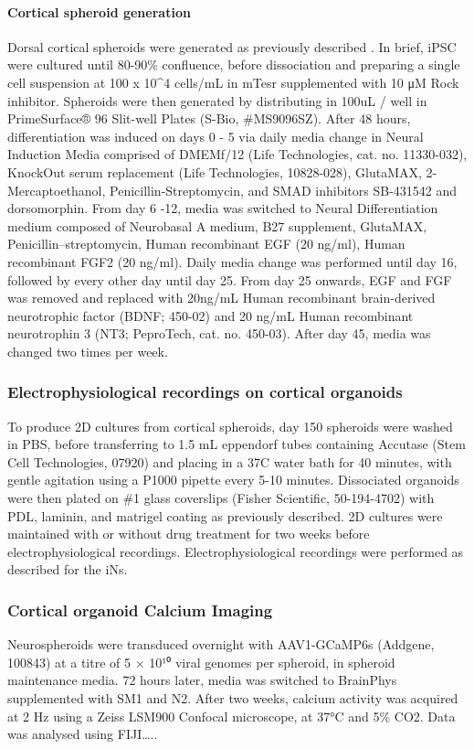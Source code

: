 \paragraph{Cortical spheroid generation}
Dorsal cortical spheroids were generated as previously described \cite{Sloan2018-ja}. In brief, iPSC were cultured until 80-90\% confluence, before dissociation and preparing a single cell suspension at 100 x 10^4 cells/mL in mTesr supplemented with 10 μM Rock inhibitor. Spheroids were then generated by distributing in 100uL / well in PrimeSurface® 96 Slit-well Plates (S-Bio, \#MS9096SZ). After 48 hours, differentiation was induced on days 0 - 5 via daily media change in Neural Induction Media comprised of DMEMf/12 (Life Technologies, cat. no. 11330-032), KnockOut serum replacement (Life Technologies, 10828-028), GlutaMAX, 2-Mercaptoethanol, Penicillin-Streptomycin, and SMAD inhibitors SB-431542 and dorsomorphin. From day 6 -12, media was switched to Neural Differentiation medium composed of Neurobasal A medium, B27 supplement, GlutaMAX, Penicillin–streptomycin, Human recombinant EGF (20 ng/ml), Human recombinant FGF2 (20 ng/ml). Daily media change was performed until day 16, followed by every other day until day 25. From day 25 onwards, EGF and FGF was removed and replaced with 20ng/mL Human recombinant brain-derived neurotrophic factor (BDNF; 450-02) and 20 ng/mL Human recombinant neurotrophin 3 (NT3; PeproTech, cat. no. 450-03). After day 45, media was changed two times per week. 

\subsubsection{Electrophysiological recordings on cortical organoids}

To produce 2D cultures from cortical spheroids, day 150 spheroids were washed in PBS, before transferring to 1.5 mL eppendorf tubes containing Accutase (Stem Cell Technologies, 07920) and placing in a 37C water bath for 40 minutes, with gentle agitation using a P1000 pipette every 5-10 minutes. Dissociated organoids were then plated on \#1 glass coverslips (Fisher Scientific, 50-194-4702) with PDL, laminin, and matrigel coating as previously described. 2D cultures were maintained with or without drug treatment for two weeks before electrophysiological recordings. Electrophysiological recordings were performed as described for the iNs.

\subsubsection{Cortical organoid Calcium Imaging}
Neurospheroids were transduced overnight with AAV1-GCaMP6s (Addgene, 100843) at a titre of 5 × 10¹⁰ viral genomes per spheroid, in spheroid maintenance media. 72 hours later, media was switched to BrainPhys supplemented with SM1 and N2. After two weeks, calcium activity was acquired at 2 Hz using a Zeiss LSM900 Confocal microscope, at 37°C and 5\% CO2. Data was analysed using FIJI….. 